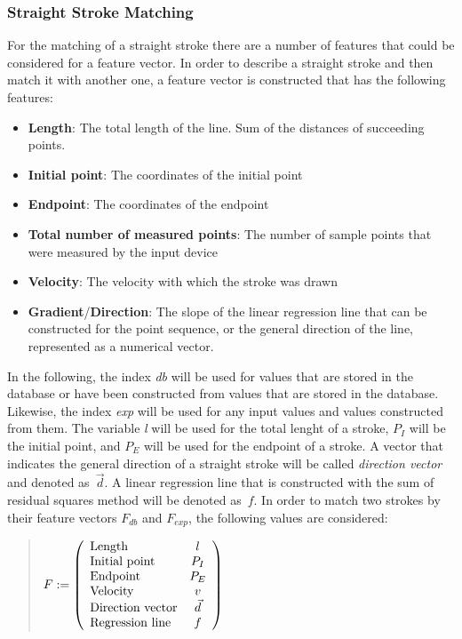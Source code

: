 \subsubsection{Straight Stroke Matching}
\label{sec:hwre:straightstrokematching}

For the matching of a straight stroke there are a number of features
that could be considered for a feature vector.
In order to describe a straight stroke and then match it with another one,
a feature vector is constructed that has the following features:
\begin{itemize}
  \item \textbf{Length}: The total length of the line. Sum of the distances of
        succeeding points.
  \item \textbf{Initial point}: The coordinates of the initial point
  \item \textbf{Endpoint}: The coordinates of the endpoint
  \item \textbf{Total number of measured points}: The number of sample
        points that were measured by the input device
  \item \textbf{Velocity}: The velocity with which the stroke was drawn
  \item \textbf{Gradient}/\textbf{Direction}: The slope of the linear 
  regression line that can be constructed for the point sequence, or
  the general direction of the line, represented as a numerical vector.
\end{itemize}
In the following, the index \emph{db} will be used for values that are
stored in the database or have been constructed from values that are stored
in the database. Likewise, the index \emph{exp} will be used for any 
input values and values constructed from them. The variable \emph{l} 
will be used for the total lenght of a stroke, \(P_{I}\) will be the 
initial point, and \(P_{E}\) will be used for the endpoint of a stroke. 
A vector that indicates the general direction of a straight stroke will be 
called \emph{direction vector} and denoted as~\(\vec{d}\). A linear regression 
line that is constructed with the sum of residual squares method 
will be denoted as~\(f\).
In order to match two strokes by their feature vectors \(F_{db} \) 
and \(F_{exp} \), the following values are considered:
\begin{quote}
\(
    F :=
    \left( 
    \begin {array} {l c} 
        \text{Length} & l \\
        \text{Initial point} & P_{I} \\
        \text{Endpoint} & P_{E} \\
        \text{Velocity} & v \\
        \text{Direction vector} & \vec{d} \\
        \text{Regression line} & f \\
    \end {array} 
    \right)
\)
\end{quote}
